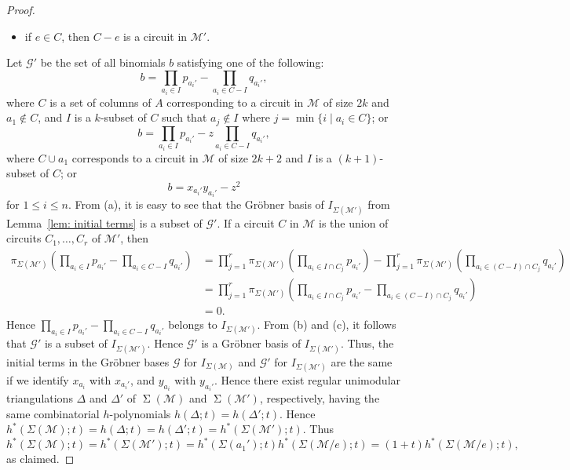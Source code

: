 \documentclass{amsart}
\numberwithin{equation}{section}
\theoremstyle{plain}
\theoremstyle{definition}
\newcommand{\grob}{\mathscr{G}}
\newcommand{\calM}{\mathcal{M}}
\DeclareMathOperator{\SEP}{\Sigma}
\begin{document}
\begin{proof}
\begin{itemize}
    \item[(c)]
    if $e \in C$, then $C - e$ is a circuit in $\calM'$. 
\end{itemize}
Let $\grob'$ be the set    
of all binomials $b$ satisfying one of the following:
     \[
         b = \prod_{a_i \in I} p_{a_i'} - \prod_{a_i \in C - I} q_{a_i'},
     \]
     where $C$ is a set of columns of $A$ corresponding to a circuit in $\calM$ of size $2k$ and $a_1 \notin C$, and $I$ is a $k$-subset of $C$ such that $a_j \notin I$ where $j = \min\{i \mid a_i \in C\}$; or
     \[
         b = \prod_{a_i \in I} p_{a_i'} - z\prod_{a_i \in C - I} q_{a_i'},
     \]
     where $C \cup a_1$ corresponds to a circuit in $\calM$ of size $2k+2$ and $I$ is a $(k+1)$-subset of $C$; or
     \[
         b = x_{a_i'}y_{a_i'} - z^2
     \]
     for $1 \leq i \leq n$.
     From (a), it is easy to see that the Gr\"obner basis of $I_{\Sigma(\calM')}$ from Lemma~\ref{lem: initial terms} is a subset of $\grob'$.
     If a circuit $C$ in $\calM$ is the union of circuits $C_1, \dots, C_r$ of $\calM'$, then 
     \[\begin{aligned}
      \pi_{\Sigma(\calM')} \left( \prod_{a_i \in I} p_{a_i'} - \prod_{a_i \in C - I} q_{a_i'} \right) &=
     \prod_{j=1}^r \pi_{\Sigma(\calM')} \left( \prod_{a_i \in I \cap C_j} p_{a_i'} \right) - 
    \prod_{j=1}^r \pi_{\Sigma(\calM')} \left( \prod_{a_i \in (C- I) \cap C_j} q_{a_i'} \right) \\
    &=
     \prod_{j=1}^r \pi_{\Sigma(\calM')} \left( \prod_{a_i \in I \cap C_j} p_{a_i'} - \prod_{a_i \in (C- I) \cap C_j} q_{a_i'} \right) \\
    &= 0.
     \end{aligned}\]
     Hence $ \prod_{a_i \in I} p_{a_i'} - \prod_{a_i \in C - I} q_{a_i'}$
     belongs to $I_{\Sigma(\calM')}$. From 
     (b) and (c), it follows that     
     $\grob'$ is a subset of $I_{\Sigma(\calM')}$.
     Hence $\grob'$ is a Gr\"obner basis of $I_{\Sigma(\calM')}$.
     Thus, the initial terms in the Gr\"obner bases $\grob$ for $I_{\Sigma(\calM)}$ and $\grob'$ for
     $I_{\Sigma(\calM')}$
     are the same if we identify $x_{a_i}$ with $x_{a_i'}$, and $y_{a_i}$ with $y_{a_i'}$.
     Hence there exist regular unimodular triangulations $\Delta$ and $\Delta'$ of $\SEP(\calM)$ and $\SEP(\calM')$, respectively, having the same combinatorial $h$-polynomials $h(\Delta;t)=h(\Delta';t)$.     
     Hence $h^*(\Sigma(\calM); t) =
     h(\Delta;t)=h(\Delta';t)= h^*(\Sigma(\calM'); t)$.
     Thus
     \[
        h^*(\Sigma(\calM); t) = h^*(\Sigma(\calM'); t) = h^*(\Sigma( a_1'
        ); t)h^*(\Sigma(\calM/e); t) = (1+t)h^*(\Sigma(\calM/e); t),
     \]
     as claimed.
\end{proof}
\end{document}
